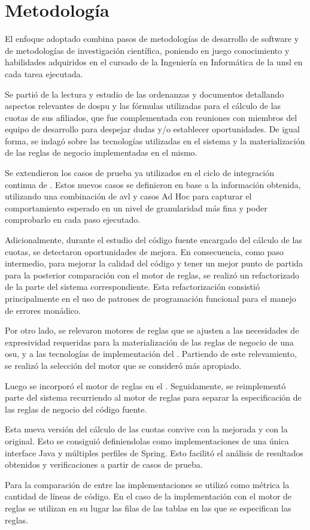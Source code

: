 \section{Metodología} \label{sec:metodologia}

El enfoque adoptado combina pasos de metodologías de desarrollo de software y de metodologías de investigación científica, poniendo en juego conocimiento y habilidades adquiridos en el cursado de la Ingeniería en Informática de la \acrshort{unsl} en cada tarea ejecutada.

Se partió de la lectura y estudio de las ordenanzas y documentos detallando aspectos relevantes de \acrshort{dospu} y las fórmulas utilizadas para el cálculo de las cuotas de sus afiliados, que fue complementada con reuniones con miembros del equipo de desarrollo {\SIDOSPU} para despejar dudas y/o establecer oportunidades. 
De igual forma, se indagó sobre las tecnologías utilizadas en el sistema y la materialización de las reglas de negocio implementadas en el mismo.

Se extendieron los casos de prueba ya utilizados en el ciclo de integración continua de {\SIDOSPU}.
Estos nuevos casos se definieron en base a la información obtenida, utilizando una combinación de \acrfull{avl} y casos Ad Hoc para capturar el comportamiento esperado en un nivel de granularidad más fina y poder comprobarlo en cada paso ejecutado.

Adicionalmente, durante el estudio del código fuente encargado del cálculo de las cuotas, se detectaron oportunidades de mejora. 
En consecuencia, como paso intermedio, para mejorar la calidad del código y tener un mejor punto de partida para la posterior comparación con el motor de reglas, se realizó un refactorizado de la parte del sistema correspondiente. 
Esta refactorización consistió principalmente en el uso de patrones de programación funcional para el manejo de errores monádico.

Por otro lado, se relevaron motores de reglas que se ajusten a las necesidades de expresividad requeridas para la materialización de las reglas de negocio de una \acrshort{osu}, y a las tecnologías de implementación del {\SIDOSPU}. 
Partiendo de este relevamiento, se realizó la selección del motor que se consideró más apropiado.

Luego se incorporó el motor de reglas en el {\SIDOSPU}. 
Seguidamente, se reimplementó parte del sistema recurriendo al motor de reglas para separar la especificación de las reglas de negocio del código fuente.

Esta nueva versión del cálculo de las cuotas convive con la mejorada y con la original. 
Esto se consiguió definiendolas como implementaciones de una única interface Java y múltiples perfiles de Spring. 
Esto facilitó el análisis de resultados obtenidos y verificaciones a partir de casos de prueba. 

Para la comparación de entre las implementaciones se utilizó como métrica la cantidad de líneas de código.  
En el caso de la implementación con el motor de reglas se utilizan en su lugar las filas de las tablas en las que se especifican las reglas.
